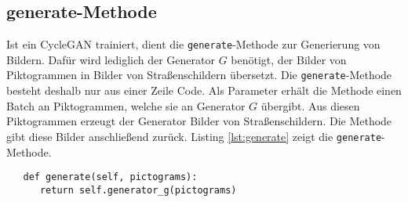 \subsection{generate-Methode}
Ist ein \ac{CycleGAN} trainiert, dient die \texttt{generate}-Methode zur Generierung von Bildern. Dafür wird lediglich der Generator $G$ benötigt, der Bilder von Piktogrammen in Bilder von Straßenschildern übersetzt. Die \texttt{generate}-Methode besteht deshalb nur aus einer Zeile Code. Als Parameter erhält die Methode einen Batch an Piktogrammen, welche sie an Generator $G$ übergibt. Aus diesen Piktogrammen erzeugt der Generator Bilder von Straßenschildern. Die Methode gibt diese Bilder anschließend zurück. Listing \ref{lst:generate} zeigt die \texttt{generate}-Methode.

\begin{code}
   \begin{verbatim}
   def generate(self, pictograms):
      return self.generator_g(pictograms)
   \end{verbatim}
   \label{lst:generate}
\end{code}